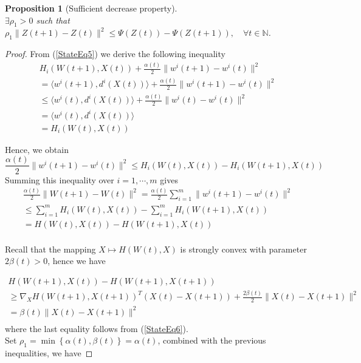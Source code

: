 \documentclass[11pt]{article}
\numberwithin{equation}{section}
\newtheorem{proposition}{Proposition}[section]
\begin{document}
\begin{proposition}[Sufficient decrease property]\ \\
$\exists \rho_1 > 0$ such that $\rho_1 \|Z(t+1) - Z(t)\|^2 \leq \Psi(Z(t)) - \Psi(Z(t+1)), \quad \forall t \in \mathbb{N} $.
\end{proposition}

\begin{proof}
From (\ref{StateEq5}) we derive the following inequality
\begin{equation*}
	\begin{split}
	H_i(W(t+1),X(t)) + \frac{\alpha(t)}{2} \|w^i(t+1) - w^i(t)\|^2 \\
	= \langle w^i(t+1) , d^i(X(t)) \rangle + \frac{\alpha(t)}{2} \|w^i(t+1) - w^i(t)\|^2 \\
	\leq \langle w^i(t) , d^i(X(t)) \rangle + \frac{\alpha(t)}{2} \|w^i(t) - w^i(t)\|^2 \\
	= \langle w^i(t) , d^i(X(t)) \rangle \\
	= H_i(W(t),X(t))
	\end{split}
\end{equation*}

Hence, we obtain
\begin{equation*}
	\frac{\alpha(t)}{2} \|w^i(t+1) - w^i(t)\|^2 
	\leq H_i(W(t),X(t)) - H_i(W(t+1),X(t))
\end{equation*}
Summing this inequality over $i=1, \cdots ,m$ gives
\begin{equation*}
	\begin{split}
	\frac{\alpha(t)}{2} \|W(t+1) - W(t)\|^2 
	= \frac{\alpha(t)}{2} \sum\limits_{i=1}^{m} \|w^i(t+1) - w^i(t)\|^2 \\
	\leq \sum\limits_{i=1}^{m} H_i(W(t),X(t)) - \sum\limits_{i=1}^{m} H_i(W(t+1),X(t)) \\
	= H(W(t),X(t)) - H(W(t+1),X(t)) \\
	\end{split}
\end{equation*}

Recall that the mapping $X \mapsto H(W(t),X)$ is strongly convex with parameter $2 \beta(t) > 0$, hence we have

\begin{equation*}
	\begin{split}
	H(W(t+1),X(t)) - H(W(t+1),X(t+1)) \\
	\geq \nabla_X H(W(t+1),X(t+1))^{T}(X(t)-X(t+1)) + \frac{2\beta(t)}{2} \|X(t) - X(t+1)\|^2 \\
	= \beta(t) \|X(t) - X(t+1)\|^2 \\
	\end{split}
\end{equation*}
where the last equality follows from (\ref{StateEq6}). \\
Set $\rho_1 = \min\left\lbrace \alpha(t) , \beta(t) \right\rbrace = \alpha(t)$, combined with the previous inequalities, we have


\end{proof}
\end{document}
